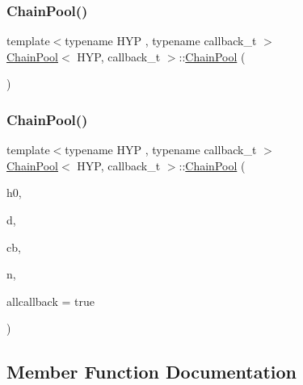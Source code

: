 \subsubsection{\texorpdfstring{Chain\+Pool()}{ChainPool()}\hspace{0.1cm}{\footnotesize\ttfamily [1/2]}}
{\footnotesize\ttfamily template$<$typename H\+YP , typename callback\+\_\+t $>$ \\
\hyperlink{class_chain_pool}{Chain\+Pool}$<$ H\+YP, callback\+\_\+t $>$\+::\hyperlink{class_chain_pool}{Chain\+Pool} (\begin{DoxyParamCaption}{ }\end{DoxyParamCaption})\hspace{0.3cm}{\ttfamily [inline]}}

\mbox{\label{class_chain_pool_ae6d9483840ee517354d429324fbcc800}} 
\subsubsection{\texorpdfstring{Chain\+Pool()}{ChainPool()}\hspace{0.1cm}{\footnotesize\ttfamily [2/2]}}
{\footnotesize\ttfamily template$<$typename H\+YP , typename callback\+\_\+t $>$ \\
\hyperlink{class_chain_pool}{Chain\+Pool}$<$ H\+YP, callback\+\_\+t $>$\+::\hyperlink{class_chain_pool}{Chain\+Pool} (\begin{DoxyParamCaption}\item[{H\+YP \&}]{h0,  }\item[{typename H\+Y\+P\+::t\+\_\+data $\ast$}]{d,  }\item[{callback\+\_\+t \&}]{cb,  }\item[{size\+\_\+t}]{n,  }\item[{bool}]{allcallback = {\ttfamily true} }\end{DoxyParamCaption})\hspace{0.3cm}{\ttfamily [inline]}}



\subsection{Member Function Documentation}
\mbox{\label{class_chain_pool_a7df513bcd7b99c2fa99a9cfdd238817b}} 
